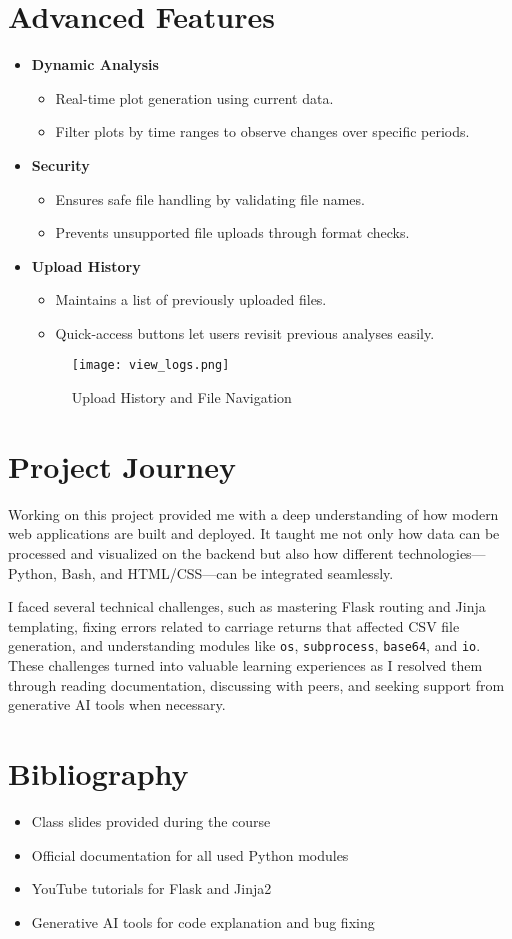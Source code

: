 \documentclass{article}
\begin{document}
\section*{Advanced Features}
\begin{itemize}
    \item \textbf{Dynamic Analysis}
    \begin{itemize}
        \item Real-time plot generation using current data.
        \item Filter plots by time ranges to observe changes over specific periods.
    \end{itemize}

    \item \textbf{Security}
    \begin{itemize}
        \item Ensures safe file handling by validating file names.
        \item Prevents unsupported file uploads through format checks.
    \end{itemize}

    \item \textbf{Upload History}
    \begin{itemize}
        \item Maintains a list of previously uploaded files.
        \item Quick-access buttons let users revisit previous analyses easily.
    \end{itemize}
    \begin{figure}[h]
        \centering
        \texttt{[image: view\_logs.png]}
        \caption{Upload History and File Navigation}
    \end{figure}
\end{itemize}

\section{Project Journey}
Working on this project provided me with a deep understanding of how modern web applications are built and deployed. It taught me not only how data can be processed and visualized on the backend but also how different technologies—Python, Bash, and HTML/CSS—can be integrated seamlessly.

I faced several technical challenges, such as mastering Flask routing and Jinja templating, fixing errors related to carriage returns that affected CSV file generation, and understanding modules like \texttt{os}, \texttt{subprocess}, \texttt{base64}, and \texttt{io}. These challenges turned into valuable learning experiences as I resolved them through reading documentation, discussing with peers, and seeking support from generative AI tools when necessary.

\section{Bibliography}
\begin{itemize}
    \item Class slides provided during the course
    \item Official documentation for all used Python modules
    \item YouTube tutorials for Flask and Jinja2
    \item Generative AI tools for code explanation and bug fixing
\end{itemize}
\end{document}
